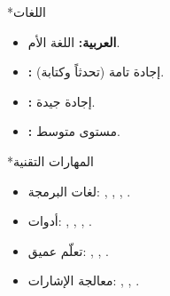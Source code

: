 \documentclass[11pt,a4paper]{article}
\makeatletter
\let\oldsection\section
\renewcommand{\section}{\@ifstar{\sectionstar}{\oldsection}}
\newcommand{\sectionstar}[1]{\oldsection*{#1}\vspace{-0.6em}{\color{rule}\hrule height 0.4pt}\vspace{0.4em}}
\makeatother
\begin{document}
\section*{اللغات}
\begin{itemize}
\item \textbf{العربية:} اللغة الأم.
\item \textbf{:} إجادة تامة (تحدثاً وكتابة).
\item \textbf{:} إجادة جيدة.
\item \textbf{:} مستوى متوسط.
\end{itemize}

\section*{المهارات التقنية}
\begin{itemize}
\item لغات البرمجة: , , , .
\item أدوات: , , , .
\item تعلّم عميق: , , .
\item معالجة الإشارات: , , .
\end{itemize}
\end{document}
